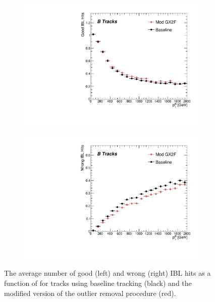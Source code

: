 \begin{figure}[!htbp]
    \centering
    \begin{subfigure}{.48\textwidth}
      \centering
      \includegraphics[width=\textwidth]{chapters/3.tracking/figs/p_nGoodHitsIBL_pTB_From_B.pdf}
    \end{subfigure}%
    \begin{subfigure}{.48\textwidth}
      \centering
      \includegraphics[width=\textwidth]{chapters/3.tracking/figs/p_nWrongHitsIBL_pTB_From_B.pdf}
    \end{subfigure}
    \caption{
      The average number of good (left) and wrong (right) IBL hits as a function of \bhadron \pt for tracks using baseline tracking (black) and the modified version of the outlier removal procedure (red).
    }
    \label{fig:gx2f_opt_hits}
\end{figure}

